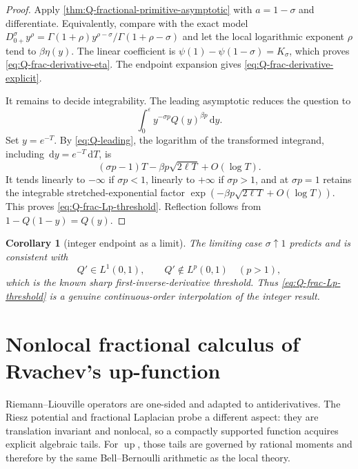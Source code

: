 \documentclass[11pt,oneside]{article}
\newtheorem{corollary}[theorem]{Corollary}
\theoremstyle{definition}
\newcommand{\Q}{Q}
\newcommand{\upf}{\operatorname{up}}
\newcommand{\dd}{\,\mathrm d}
\begin{document}
\begin{proof}
Apply \cref{thm:Q-fractional-primitive-asymptotic} with \(a=1-\sigma\) and
differentiate.  Equivalently, compare with the exact model
\(
 D_{0+}^{\sigma}y^\rho
 =\Gamma(1+\rho)y^{\rho-\sigma}/\Gamma(1+\rho-\sigma)
\)
and let the local logarithmic exponent \(\rho\) tend to \(\beta\eta(y)\).  The
linear coefficient is
\(
 \psi(1)-\psi(1-\sigma)=K_\sigma
\), which proves \eqref{eq:Q-frac-derivative-eta}.  The endpoint expansion gives
\eqref{eq:Q-frac-derivative-explicit}.

It remains to decide integrability.  The leading asymptotic reduces the question to
\begin{equation}\label{eq:critical-integral}
 \int_0^\varepsilon y^{-\sigma p}\Q(y)^{\beta p}\dd y.
\end{equation}
Set \(y=e^{-T}\).  By \eqref{eq:Q-leading}, the logarithm of the transformed
integrand, including \(\dd y=e^{-T}\dd T\), is
\begin{equation}\label{eq:critical-exponent}
 (\sigma p-1)T-\beta p\sqrt{2\ell T}+O(\log T).
\end{equation}
It tends linearly to \(-\infty\) if \(\sigma p<1\), linearly to \(+\infty\) if
\(\sigma p>1\), and at \(\sigma p=1\) retains the integrable stretched-exponential
factor \(\exp(-\beta p\sqrt{2\ell T}+O(\log T))\).  This proves
\eqref{eq:Q-frac-Lp-threshold}.  Reflection follows from
\(1-\Q(1-y)=\Q(y)\).
\end{proof}

\begin{corollary}[integer endpoint as a limit]\label{cor:Qprime-critical}
The limiting case \(\sigma\uparrow1\) predicts and is consistent with
\begin{equation}\label{eq:Qprime-Lp}
 \Q'\in L^1(0,1),
 \qquad
 \Q'\notin L^p(0,1)\quad(p>1),
\end{equation}
which is the known sharp first-inverse-derivative threshold.  Thus
\eqref{eq:Q-frac-Lp-threshold} is a genuine continuous-order interpolation of the
integer result.
\end{corollary}

\section{Nonlocal fractional calculus of Rvachev's up-function}
\label{sec:up-nonlocal-fractional}

Riemann--Liouville operators are one-sided and adapted to antiderivatives.  The Riesz
potential and fractional Laplacian probe a different aspect: they are translation
invariant and nonlocal, so a compactly supported function acquires explicit algebraic
tails.  For \(\upf\), those tails are governed by rational moments and therefore by the
same Bell--Bernoulli arithmetic as the local theory.
\end{document}
